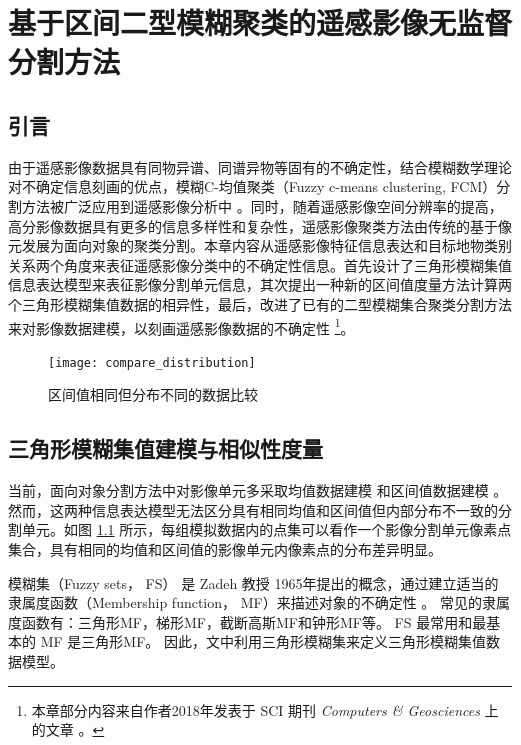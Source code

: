 
\chapter{基于区间二型模糊聚类的遥感影像无监督分割方法}
\label{cha:chap03}

\section{引言}
\label{sec:chap03-1}
由于遥感影像数据具有同物异谱、同谱异物等固有的不确定性，结合模糊数学理论对不确定信息刻画的优点，模糊C-均值聚类（Fuzzy c-means clustering, FCM）分割方法被广泛应用到遥感影像分析中 \cite{bezdek1984fcm}。同时，随着遥感影像空间分辨率的提高，高分影像数据具有更多的信息多样性和复杂性，遥感影像聚类方法由传统的基于像元发展为面向对象的聚类分割。本章内容从遥感影像特征信息表达和目标地物类别关系两个角度来表征遥感影像分类中的不确定性信息。首先设计了三角形模糊集值信息表达模型来表征影像分割单元信息，其次提出一种新的区间值度量方法计算两个三角形模糊集值数据的相异性，最后，改进了已有的二型模糊集合聚类分割方法来对影像数据建模，以刻画遥感影像数据的不确定性  \footnote{本章部分内容来自作者2018年发表于 SCI 期刊 \textit{Computers \& Geosciences} 上的文章 \cite{jiang2018enhanced}。 }。

\begin{figure}[!htb]
    \centering
    \texttt{[image: compare\_distribution]}
    \caption{区间值相同但分布不同的数据比较}
    \label{fig:compare_distribution}
\end{figure}

\section{三角形模糊集值建模与相似性度量}
\label{sec:chap03-2}
当前，面向对象分割方法中对影像单元多采取均值数据建模 \cite{yu2012method} 和区间值数据建模 \cite{he2016remote} 。然而，这两种信息表达模型无法区分具有相同均值和区间值但内部分布不一致的分割单元。如图 \ref{fig:compare_distribution} 所示，每组模拟数据内的点集可以看作一个影像分割单元像素点集合，具有相同的均值和区间值的影像单元内像素点的分布差异明显。

模糊集（Fuzzy sets， FS） 是 Zadeh 教授 1965年提出的概念，通过建立适当的隶属度函数（Membership function， MF）来描述对象的不确定性 \cite{zadeh1965fuzzy}。 常见的隶属度函数有：三角形MF，梯形MF，截断高斯MF和钟形MF等。 FS 最常用和最基本的 MF 是三角形MF。 因此，文中利用三角形模糊集来定义三角形模糊集值数据模型。


